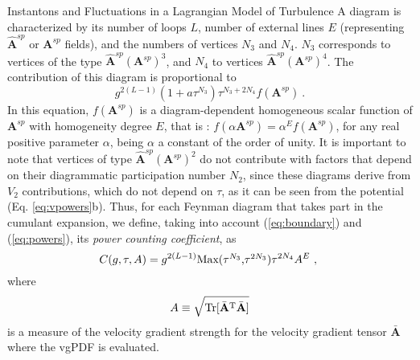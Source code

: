 \begin{chapter}{Instantons and Fluctuations in a Lagrangian Model of Turbulence}
A diagram is characterized by its number of loops $L$, number of external lines $E$ (representing $\hat {\mathbf{A}}^{sp}$ or ${\mathbf{A}}^{sp}$ fields), and the numbers of vertices $N_3$ and $N_4$. $N_3$ corresponds to vertices of the type $\hat {\mathbf{A}}^{sp}({\mathbf{A}^{sp}})^3$, and $N_4$ to vertices $\hat {\mathbf{A}}^{sp}({\mathbf{A}^{sp}})^4$. The contribution of this diagram is proportional to 
\begin{equation} \label{eq:powers}
 g^{2(L-1)} (1 + a\tau^{N_3})\tau^{N_3 + 2 N_4} f( {\mathbf{A}}^{sp} ) \ .
\end{equation}
In this equation, $f( {\mathbf{A}}^{sp} )$ is a diagram-dependent homogeneous scalar function of ${\mathbf{A}}^{sp}$ with homogeneity degree $E$, that is : $f( \alpha {\mathbf{A}}^{sp}) = \alpha^E f( {\mathbf{A}}^{sp} )$, for any real positive parameter $\alpha$, being $\alpha$ a constant of the order of unity. It is important to note that vertices of type $\hat {\mathbf{A}}^{sp}({\mathbf{A}^{sp}})^2$ do not contribute with factors that depend on their diagrammatic participation number $N_2$, since these diagrams derive from $V_2$ contributions, which do not depend on $\tau$, as it can be seen from the potential (Eq. \ref{eq:vpowers}b). Thus, for each Feynman diagram that takes part in the cumulant expansion, we define, taking into account (\ref{eq:boundary}) and (\ref{eq:powers}), its \textit{power counting coefficient}, as
\begin{equation}
C(g,\tau, A) = g^{2(L-1)} {\hbox{Max($\tau^{N_3}$,$\tau^{2N_3}$)}} \tau^{2 N_4} A^E \label{power_count_coeff} \ , \ 
\end{equation}
where 
\begin{equation}
A \equiv \sqrt{ \mathrm{Tr} [ \bar {\mathbf{A}}^{\mathrm{T}}  \bar {\mathbf{A}}] }
\end{equation}
is a measure of the velocity gradient strength for the velocity gradient tensor $\bar {\mathbf{A}}$ where the vgPDF is evaluated. 


\end{chapter}
